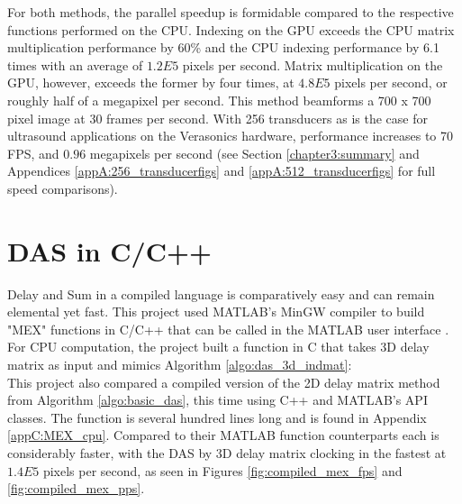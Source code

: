     


    For both methods, the parallel speedup is formidable compared to the respective functions performed on the CPU. Indexing on the GPU exceeds the CPU matrix multiplication performance by 60\% and the CPU indexing performance by 6.1 times with an average of $1.2E5$ pixels per second. Matrix multiplication on the GPU, however, exceeds the former by four times, at $4.8E5$ pixels per second, or roughly half of a megapixel per second. This method beamforms a 700 x 700 pixel image at 30 frames per second. With 256 transducers as is the case for ultrasound applications on the Verasonics hardware, performance increases to 70 FPS, and $0.96$ megapixels per second (see Section \ref{chapter3:summary} and Appendices \ref{appA:256_transducerfigs} and \ref{appA:512_transducerfigs} for full speed comparisons).

\section{DAS in C/C++}
\label{chapter3:compiled_DAS}

    Delay and Sum in a compiled language is comparatively easy and can remain elemental yet fast. This project used MATLAB's MinGW compiler \cite{MATLABSupportMinGWw64} to build "MEX" functions in C/C++ that can be called in the MATLAB user interface \cite{CallMEXFunctions}. For CPU computation, the project built a function in C that takes 3D delay matrix as input and mimics Algorithm \ref{algo:das_3d_indmat}: 
    \\
    

    This project also compared a compiled version of the 2D delay matrix method from Algorithm \ref{algo:basic_das}, this time using C++ and MATLAB's API classes. The function is several hundred lines long and is found in Appendix \ref{appC:MEX_cpu}. Compared to their MATLAB function counterparts each is considerably faster, with the DAS by 3D delay matrix clocking in the fastest at $1.4E5$ pixels per second, as seen in Figures \ref{fig:compiled_mex_fps} and \ref{fig:compiled_mex_pps}.

